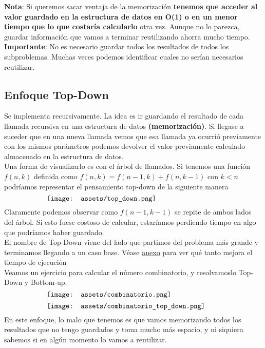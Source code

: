 \documentclass[10pt,a4paper]{article}
\begin{document}
\textbf{Nota}: Si queremos sacar ventaja de la memorización \textbf{tenemos que acceder al valor guardado en la estructura de datos en O(1) o en un menor tiempo que lo que costaría calcularlo} otra vez. Aunque no lo parezca, guardar información que vamos a terminar reutilizando ahorra mucho tiempo. \\

\textbf{Importante}: No es necesario guardar todos los resultados de todos los subproblemas. Muchas veces podemos identificar cuales no serían necesarios reutilizar. \\

\subsection*{Enfoque Top-Down} 
Se implementa recursivamente. La idea es ir guardando el resultado de cada llamada recursiva en una estructura de datos \textbf{(memorización)}. Si llegase a suceder que en una nueva llamada vemos que esa llamada ya ocurrió previamente con los mismos parámetros podemos devolver el valor previamente calculado almacenado en la estructura de datos.  \\ 

Una forma de visualizarlo es con el árbol de llamados. Si tenemos una función $f(n, k)$ definida como $f(n, k) = f(n-1, k) + f(n, k-1)$ con $k<n$ podríamos representar el pensamiento top-down de la siguiente manera
\[\begin{minipage}[b]{0.7\textwidth}
    \texttt{[image: assets/top\_down.png]}
\end{minipage}\]
Claramente podemos observar como $f(n-1, k-1)$ se repite de ambos lados del árbol. Si esto fuese costoso de calcular, estaríamos perdiendo tiempo en algo que podríamos haber guardado. \\

El nombre de Top-Down viene del lado que partimos del problema más grande y terminamos llegando a un caso base.
Véase \hyperref[subsec:top_down_programacion_dinamica]{\underline{anexo}} para ver qué tanto mejora el tiempo de ejecución \\

Veamos un ejercicio para calcular el número combinatorio, y resolvamoslo Top-Down y Bottom-up. \\
\[\begin{minipage}[b]{0.7\textwidth}
    \texttt{[image: assets/combinatorio.png]}
\end{minipage}\]
\[\begin{minipage}[b]{0.7\textwidth}
    \texttt{[image: assets/combinatorio\_top\_down.png]}
\end{minipage}\]
En este enfoque, lo malo que tenemos es que vamos memorizando todos los resultados que no tengo guardados y toma mucho más espacio, y ni siquiera sabemos si en algún momento lo vamos a reutilizar.
\end{document}
